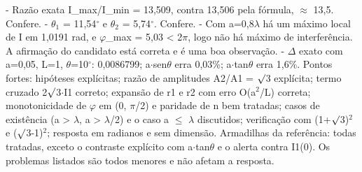 \documentclass{article}%
\begin{document}
{-} Razão exata I\_max/I\_min = 13,509, contra 13,506 pela fórmula, $\approx$ 13,5. Confere.\newline%
{-} $\theta$$_{1}$ = 11,54$^\circ$ e $\theta$$_{2}$ = 5,74$^\circ$. Confere.\newline%
{-} Com a=0,8$\lambda$ há um máximo local de I em 1,0191 rad, e $\varphi$\_max = 5,03 < 2$\pi$, logo não há máximo de interferência. A afirmação do candidato está correta e é uma boa observação.\newline%
{-} $\Delta$ exato com a=0,05, L=1, $\theta$=10$^\circ$: 0,0086799; a$\cdot$sen$\theta$ erra 0,03\%; a$\cdot$tan$\theta$ erra 1,6\%.\newline%
\newline%
Pontos fortes: hipóteses explícitas; razão de amplitudes A2/A1 = $\surd$3 explícita; termo cruzado 2$\surd$3$\cdot$I1 correto; expansão de r1 e r2 com erro O(a$^2$/L) correta; monotonicidade de $\varphi$ em (0, $\pi$/2) e paridade de n bem tratadas; casos de existência (a > $\lambda$, a > $\lambda$/2) e o caso a $\leq$ $\lambda$ discutidos; verificação com (1+$\surd$3)$^2$ e ($\surd$3-1)$^2$; resposta em radianos e sem dimensão.\newline%
\newline%
Armadilhas da referência: todas tratadas, exceto o contraste explícito com a$\cdot$tan$\theta$ e o alerta contra I1(0). Os problemas listados são todos menores e não afetam a resposta.%
\end{document}
